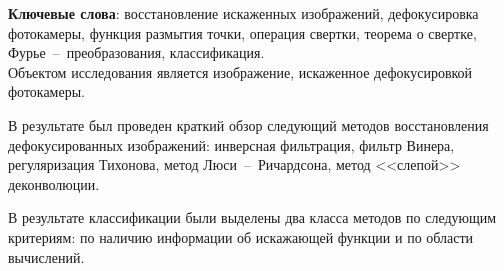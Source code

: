 \begin{essay}{}
    \noindent\textbf{Ключевые слова}: восстановление искаженных изображений, дефокусировка фотокамеры, функция размытия точки, операция свертки, теорема о свертке, Фурье~--~преобразования, классификация.\\
    
    Объектом исследования является изображение, искаженное дефокусировкой фотокамеры.
    
    В результате был проведен краткий обзор следующий методов восстановления дефокусированных изображений: инверсная фильтрация, фильтр Винера, регуляризация Тихонова, метод Люси~--~Ричардсона, метод <<слепой>> деконволюции. 
    
    В результате классификации были выделены два класса методов по следующим критериям: по наличию информации об искажающей функции и по области вычислений.
\end{essay}